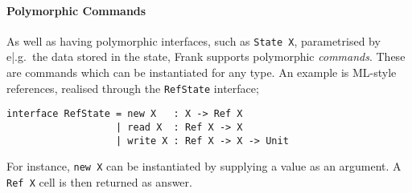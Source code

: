 \documentclass[msc,deptreport,cs]{infthesis} %
\newcommand{\code}[1]{\lstinline{#1}}
\begin{document}
 


\paragraph*{Polymorphic Commands}

As well as having polymorphic interfaces, such as \code{State X}, parametrised
by e|.g.~the data stored in the state, Frank supports polymorphic
\emph{commands}. These are commands which can be instantiated for any type. An
example is ML-style references, realised through the \code{RefState} interface;

\begin{lstlisting}
interface RefState = new X   : X -> Ref X
                   | read X  : Ref X -> X
                   | write X : Ref X -> X -> Unit
\end{lstlisting}

\noindent For instance, \code{new X} can be instantiated by supplying a value as
an argument. A \code{Ref X} cell is then returned as answer.
\end{document}
